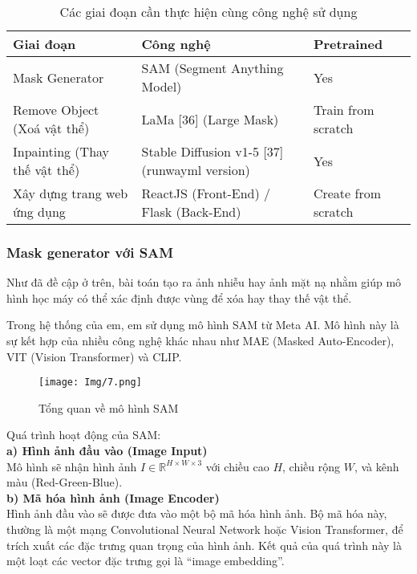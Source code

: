 \documentclass[12pt]{report}
\begin{document}
\begin{table}[H]
\centering
\caption{Các giai đoạn cần thực hiện cùng công nghệ sử dụng}
\begin{tabularx}{\linewidth}{|l|>{\raggedright\arraybackslash}X|l|}
\hline
\textbf{Giai đoạn} & \textbf{Công nghệ} & \textbf{Pretrained} \\ \hline
Mask Generator & SAM (Segment Anything Model) & Yes \\ \hline
Remove Object (Xoá vật thể) & LaMa [36] (Large Mask) & Train from scratch \\ \hline
Inpainting (Thay thế vật thể) & Stable Diffusion v1-5 [37] (runwayml version) & Yes \\ \hline
Xây dựng trang web ứng dụng & ReactJS (Front-End) / Flask (Back-End) & Create from scratch \\ \hline
\end{tabularx}
\end{table}

\subsubsection*{Mask generator với SAM}

Như đã đề cập ở trên, bài toán tạo ra ảnh nhiễu hay ảnh mặt nạ nhằm giúp mô hình học máy có thể xác định được vùng để xóa hay thay thế vật thể.

Trong hệ thống của em, em sử dụng mô hình SAM từ Meta AI. Mô hình này là sự kết hợp của nhiều công nghệ khác nhau như MAE (Masked Auto-Encoder), VIT (Vision Transformer) và CLIP.

\begin{figure}[H]
    \centering
    \texttt{[image: Img/7.png]}
    \caption{Tổng quan về mô hình SAM}
\end{figure}

Quá trình hoạt động của SAM:\\
\textbf{a) Hình ảnh đầu vào (Image Input)} \\
Mô hình sẽ nhận hình ảnh \( I \in \mathbb{R}^{H \times W \times 3} \) với chiều cao \( H \), chiều rộng \( W \), và kênh màu (Red-Green-Blue).\\
\textbf{b) Mã hóa hình ảnh (Image Encoder)}\\
Hình ảnh đầu vào sẽ được đưa vào một bộ mã hóa hình ảnh. Bộ mã hóa này, thường là một mạng Convolutional Neural Network hoặc Vision Transformer, để trích xuất các đặc trưng quan trọng của hình ảnh. Kết quả của quá trình này là một loạt các vector đặc trưng gọi là “image embedding”.
\end{document}
